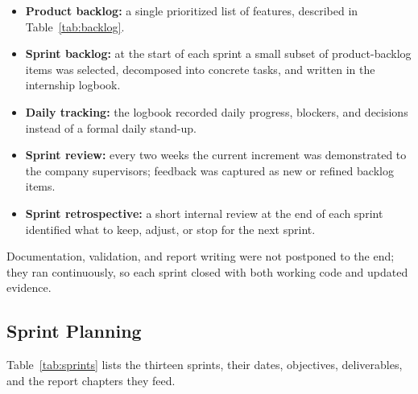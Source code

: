 \begin{itemize}[leftmargin=1cm]
  \item \textbf{Product backlog:} a single prioritized list of features, described in Table~\ref{tab:backlog}.
  \item \textbf{Sprint backlog:} at the start of each sprint a small subset of product-backlog items was selected, decomposed into concrete tasks, and written in the internship logbook.
  \item \textbf{Daily tracking:} the logbook recorded daily progress, blockers, and decisions instead of a formal daily stand-up.
  \item \textbf{Sprint review:} every two weeks the current increment was demonstrated to the company supervisors; feedback was captured as new or refined backlog items.
  \item \textbf{Sprint retrospective:} a short internal review at the end of each sprint identified what to keep, adjust, or stop for the next sprint.
\end{itemize}

Documentation, validation, and report writing were not postponed to the end; they ran continuously, so each sprint closed with both working code and updated evidence.

\subsection{Sprint Planning}

Table~\ref{tab:sprints} lists the thirteen sprints, their dates, objectives, deliverables, and the report chapters they feed.

